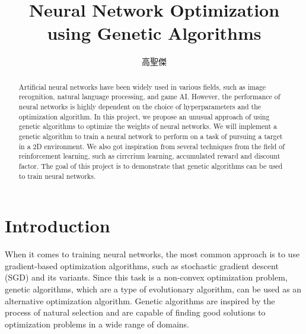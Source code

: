 \documentclass[sigconf]{acmart}
\begin{document}
\title{Neural Network Optimization using Genetic Algorithms}

\begin{CJK}{UTF8}{bkai}
  \author{高聖傑}

\renewcommand{\shortauthors}{Kao, Sheng-Jie}

\begin{abstract}
Artificial neural networks have been widely used in various fields, such as image recognition, natural language processing, and game AI. However, the performance of neural networks is highly dependent on the choice of hyperparameters and the optimization algorithm. In this project, we propose an unusual approach of using genetic algorithms to optimize the weights of neural networks. We will implement a genetic algorithm to train a neural network to perform on a task of pursuing a target in a 2D environment. We also got inspiration from several techniques from the field of reinforcement learning, such as cirrcrium learning, accumulated reward and discount factor. The goal of this project is to demonstrate that genetic algorithms can be used to train neural networks.
\end{abstract}

\maketitle
\end{CJK}

\section{Introduction}
When it comes to training neural networks, the most common approach is to use gradient-based optimization algorithms, such as stochastic gradient descent (SGD) and its variants. Since this task is a non-convex optimization problem, genetic algorithms, which are a type of evolutionary algorithm, can be used as an alternative optimization algorithm. Genetic algorithms are inspired by the process of natural selection and are capable of finding good solutions to optimization problems in a wide range of domains. 
\end{document}
